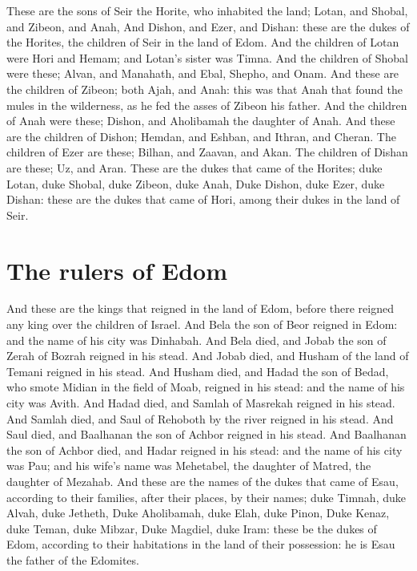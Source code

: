 \begin{biblechapter}
\verse These are the sons of Seir the Horite, who inhabited the land; Lotan, and Shobal, and Zibeon, and Anah,
\verse And Dishon, and Ezer, and Dishan: these are the dukes of the Horites, the children of Seir in the land of Edom.
\verse And the children of Lotan were Hori and Hemam; and Lotan's sister was Timna.
\verse And the children of Shobal were these; Alvan, and Manahath, and Ebal, Shepho, and Onam.
\verse And these are the children of Zibeon; both Ajah, and Anah: this was that Anah that found the mules in the wilderness, as he fed the asses of Zibeon his father.
\verse And the children of Anah were these; Dishon, and Aholibamah the daughter of Anah.
\verse And these are the children of Dishon; Hemdan, and Eshban, and Ithran, and Cheran.
\verse The children of Ezer are these; Bilhan, and Zaavan, and Akan.
\verse The children of Dishan are these; Uz, and Aran.
\verse These are the dukes that came of the Horites; duke Lotan, duke Shobal, duke Zibeon, duke Anah,
\verse Duke Dishon, duke Ezer, duke Dishan: these are the dukes that came of Hori, among their dukes in the land of Seir.
\section*{The rulers of Edom}
\verse And these are the kings that reigned in the land of Edom, before there reigned any king over the children of Israel.
\verse And Bela the son of Beor reigned in Edom: and the name of his city was Dinhabah.
\verse And Bela died, and Jobab the son of Zerah of Bozrah reigned in his stead.
\verse And Jobab died, and Husham of the land of Temani reigned in his stead.
\verse And Husham died, and Hadad the son of Bedad, who smote Midian in the field of Moab, reigned in his stead: and the name of his city was Avith.
\verse And Hadad died, and Samlah of Masrekah reigned in his stead.
\verse And Samlah died, and Saul of Rehoboth by the river reigned in his stead.
\verse And Saul died, and Baalhanan the son of Achbor reigned in his stead.
\verse And Baalhanan the son of Achbor died, and Hadar reigned in his stead: and the name of his city was Pau; and his wife's name was Mehetabel, the daughter of Matred, the daughter of Mezahab.
\verse And these are the names of the dukes that came of Esau, according to their families, after their places, by their names; duke Timnah, duke Alvah, duke Jetheth,
\verse Duke Aholibamah, duke Elah, duke Pinon,
\verse Duke Kenaz, duke Teman, duke Mibzar,
\verse Duke Magdiel, duke Iram: these be the dukes of Edom, according to their habitations in the land of their possession: he is Esau the father of the Edomites.
\end{biblechapter}

